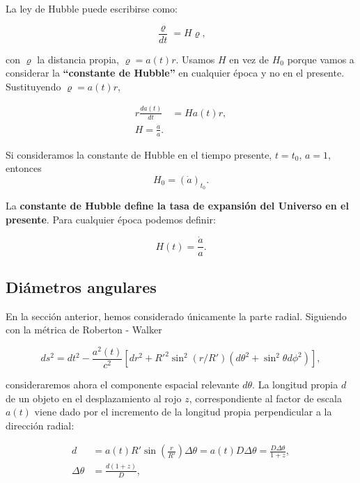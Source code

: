 \documentclass[11pt]{article}
\begin{document}
La ley de Hubble puede escribirse como: 


 \begin{equation}
        \frac{\varrho}{dt} = H\varrho,
    \end{equation}

con $\varrho$ la distancia propia, $\varrho = a(t) r$. Usamos $H$ en vez de $H_0$ porque vamos a considerar la {\bf{``constante de Hubble''}} en cualquier época y no en el presente. Sustituyendo $\varrho = a(t) r$,

    \begin{align}
        r\frac{da(t)}{dt} & = Ha(t)r, \\
        H = \frac{\dot{a}}{a}.
    \end{align}

Si consideramos la constante de Hubble en el tiempo presente, $t= t_0$, $a=1$, entonces 
    \begin{equation}
        H_0 = (\dot{a})_{t_0}.
    \end{equation}

La {\bf{constante de Hubble define la tasa de expansión del Universo en el presente}}. Para cualquier época podemos definir: 

    \begin{equation}
        H(t) = \frac{\dot{a}}{a}.
    \end{equation}

\subsection{Diámetros angulares}

En la sección anterior, hemos considerado únicamente la parte radial. Siguiendo con la métrica de Roberton - Walker 

        $$ds^2 = dt^2 - \frac{a^2(t)}{c^2} [dr^2 + R'^2 \sin^2(r/R')(d \theta^2 + \sin^2 \theta d\phi^2)],$$
  
  consideraremos ahora el componente espacial relevante $d\theta$. La longitud propia $d$ de un objeto en el desplazamiento al rojo $z$, correspondiente al factor de escala $a(t)$ viene dado por el incremento de la longitud propia perpendicular a la dirección radial:
  
  \begin{align}
      d & = a(t) R' \sin \left(\frac{r}{R'} \right) \Delta \theta = a(t) D \Delta \theta = \frac{D \Delta \theta}{1+z}, \\
      \Delta \theta & = \frac{d(1+z)}{D},
  \end{align}
\end{document}
